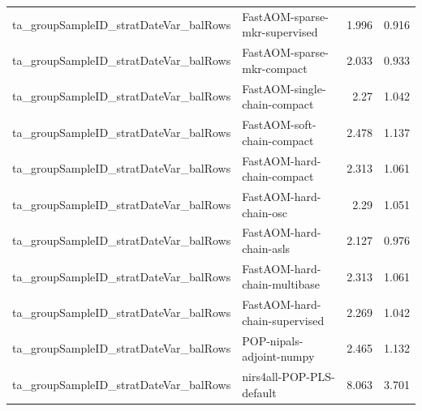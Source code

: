 \begin{landscape}
\begin{longtable}{L{8.0cm}L{9.5cm}rr}
ta\_\allowbreak{}groupSampleID\_\allowbreak{}stratDateVar\_\allowbreak{}balRows & FastAOM-\allowbreak{}sparse-\allowbreak{}mkr-\allowbreak{}supervised & 1.996 & 0.916 \\
ta\_\allowbreak{}groupSampleID\_\allowbreak{}stratDateVar\_\allowbreak{}balRows & FastAOM-\allowbreak{}sparse-\allowbreak{}mkr-\allowbreak{}compact & 2.033 & 0.933 \\
ta\_\allowbreak{}groupSampleID\_\allowbreak{}stratDateVar\_\allowbreak{}balRows & FastAOM-\allowbreak{}single-\allowbreak{}chain-\allowbreak{}compact & 2.27 & 1.042 \\
ta\_\allowbreak{}groupSampleID\_\allowbreak{}stratDateVar\_\allowbreak{}balRows & FastAOM-\allowbreak{}soft-\allowbreak{}chain-\allowbreak{}compact & 2.478 & 1.137 \\
ta\_\allowbreak{}groupSampleID\_\allowbreak{}stratDateVar\_\allowbreak{}balRows & FastAOM-\allowbreak{}hard-\allowbreak{}chain-\allowbreak{}compact & 2.313 & 1.061 \\
ta\_\allowbreak{}groupSampleID\_\allowbreak{}stratDateVar\_\allowbreak{}balRows & FastAOM-\allowbreak{}hard-\allowbreak{}chain-\allowbreak{}osc & 2.29 & 1.051 \\
ta\_\allowbreak{}groupSampleID\_\allowbreak{}stratDateVar\_\allowbreak{}balRows & FastAOM-\allowbreak{}hard-\allowbreak{}chain-\allowbreak{}asls & 2.127 & 0.976 \\
ta\_\allowbreak{}groupSampleID\_\allowbreak{}stratDateVar\_\allowbreak{}balRows & FastAOM-\allowbreak{}hard-\allowbreak{}chain-\allowbreak{}multibase & 2.313 & 1.061 \\
ta\_\allowbreak{}groupSampleID\_\allowbreak{}stratDateVar\_\allowbreak{}balRows & FastAOM-\allowbreak{}hard-\allowbreak{}chain-\allowbreak{}supervised & 2.269 & 1.042 \\
ta\_\allowbreak{}groupSampleID\_\allowbreak{}stratDateVar\_\allowbreak{}balRows & POP-\allowbreak{}nipals-\allowbreak{}adjoint-\allowbreak{}numpy & 2.465 & 1.132 \\
ta\_\allowbreak{}groupSampleID\_\allowbreak{}stratDateVar\_\allowbreak{}balRows & nirs4all-\allowbreak{}POP-\allowbreak{}PLS-\allowbreak{}default & 8.063 & 3.701 \\
\bottomrule
\end{longtable}
\endgroup
\end{landscape}
\clearpage
